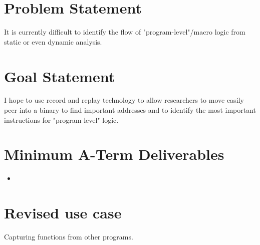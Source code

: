 \maketitle

\section{Problem Statement}

It is currently difficult to identify the flow of "program-level"/macro logic from static or even dynamic analysis. 

\section{Goal Statement}

I hope to use record and replay technology to allow researchers to move easily peer into a binary to find important addresses and to identify the most important instructions for "program-level" logic.

\section{Minimum A-Term Deliverables}

\begin{itemize}
  \item 
{}
\end{itemize}

\section{Revised use case}
Capturing functions from other programs. 

